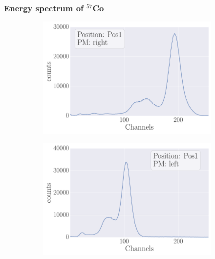 \subsubsection{Energy spectrum of $^{57}$Co}
\begin{figure}[H]
    \begin{subfigure}[b]{\picwidth}
        \includegraphics[width=\textwidth]{analysis/figures/plot2_1a}
        \caption{}
    \end{subfigure}\qquad
    \begin{subfigure}[b]{\picwidth}
        \includegraphics[width=\textwidth]{analysis/figures/plot2_1b}
        \caption{}
    \end{subfigure}
    \begin{subfigure}[b]{\picwidth}

\end{subfigure}
\end{figure}
